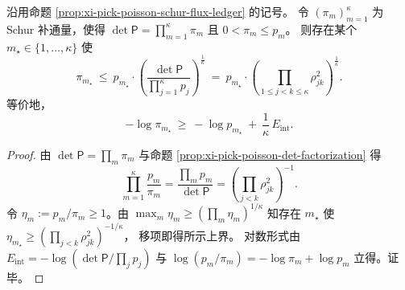 \begin{corollary}\label{cor:xi-pick-poisson-schur-one-step-collapse}
沿用命题 \ref{prop:xi-pick-poisson-schur-flux-ledger} 的记号。
令 \((\pi_m)_{m=1}^{\kappa}\) 为 Schur 补通量，使得 \(\det\mathsf P=\prod_{m=1}^{\kappa}\pi_m\) 且 \(0<\pi_m\le p_m\)。
则存在某个 \(m_\star\in\{1,\dots,\kappa\}\) 使
\[
\pi_{m_\star}\ \le\ p_{m_\star}\cdot
\left(\frac{\det\mathsf P}{\prod_{j=1}^{\kappa}p_j}\right)^{\!\frac1\kappa}
\ =\
p_{m_\star}\cdot\left(\prod_{1\le j<k\le\kappa}\rho_{jk}^2\right)^{\!\frac1\kappa}.
\]
等价地，
\[
-\log\pi_{m_\star}\ \ge\ -\log p_{m_\star}\ +\ \frac1\kappa\,E_{\mathrm{int}}.
\]
\end{corollary}
\begin{proof}
由 \(\det\mathsf P=\prod_m \pi_m\) 与命题 \ref{prop:xi-pick-poisson-det-factorization} 得
\[
\prod_{m=1}^{\kappa}\frac{p_m}{\pi_m}
=\frac{\prod_m p_m}{\det\mathsf P}
=\left(\prod_{j<k}\rho_{jk}^2\right)^{-1}.
\]
令 \(\eta_m:=p_m/\pi_m\ge 1\)。由 \(\max_m\eta_m\ge (\prod_m\eta_m)^{1/\kappa}\) 知存在 \(m_\star\) 使
\(
\eta_{m_\star}\ge \left(\prod_{j<k}\rho_{jk}^2\right)^{-1/\kappa}
\)，
移项即得所示上界。
对数形式由 \(E_{\mathrm{int}}=-\log(\det\mathsf P/\prod_j p_j)\) 与 \(\log(p_m/\pi_m)=-\log\pi_m+\log p_m\) 立得。证毕。
\end{proof}
